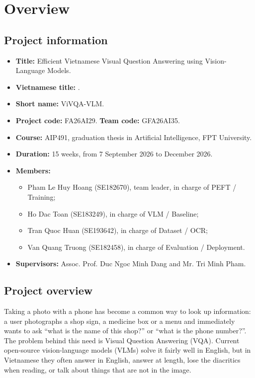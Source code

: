 \section{Overview}
\label{sec:intro-overview}

\subsection{Project information}

\begin{itemize}
  \item \textbf{Title:} Efficient Vietnamese Visual Question Answering using
  Vision-Language Models.
  \item \textbf{Vietnamese title:} .
  \item \textbf{Short name:} ViVQA-VLM.
  \item \textbf{Project code:} FA26AI29. \textbf{Team code:} GFA26AI35.
  \item \textbf{Course:} AIP491, graduation thesis in Artificial Intelligence, FPT
  University.
  \item \textbf{Duration:} 15 weeks, from 7 September 2026 to December 2026.
  \item \textbf{Members:}
  \begin{itemize}
    \item Pham Le Huy Hoang (SE182670), team leader, in charge of PEFT / Training;
    \item Ho Dac Toan (SE183249), in charge of VLM / Baseline;
    \item Tran Quoc Huan (SE193642), in charge of Dataset / OCR;
    \item Van Quang Truong (SE182458), in charge of Evaluation / Deployment.
  \end{itemize}
  \item \textbf{Supervisors:} Assoc. Prof. Duc Ngoc Minh Dang and Mr. Tri Minh Pham.
\end{itemize}

\subsection{Project overview}

Taking a photo with a phone has become a common way to look up information: a user
photographs a shop sign, a medicine box or a menu and immediately wants to ask
``what is the name of this shop?'' or ``what is the phone number?''. The problem
behind this need is Visual Question Answering (VQA). Current open-source
vision-language models (VLMs) solve it fairly well in English, but in Vietnamese
they often answer in English, answer at length, lose the diacritics when reading,
or talk about things that are not in the image.

